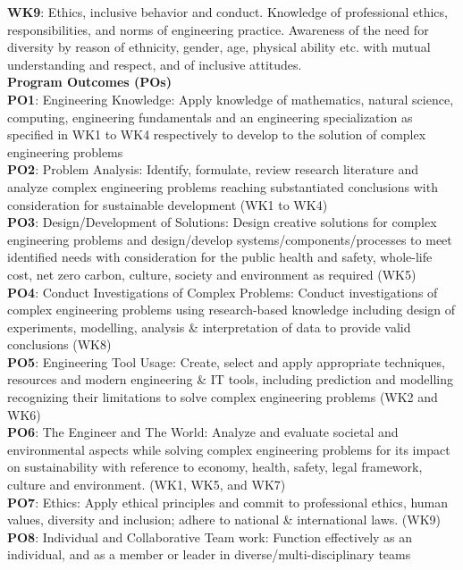 \begin{titlepage}
{\textbf{WK9}: Ethics, inclusive behavior and conduct. Knowledge of professional ethics,
responsibilities, and norms of engineering practice. Awareness of the need for diversity by reason of ethnicity, gender, age, physical ability etc. with mutual understanding and respect, and of inclusive attitudes.\\
\textbf{Program Outcomes (POs)}\\
\textbf{PO1}: Engineering Knowledge: Apply knowledge of mathematics, natural science, computing, engineering fundamentals and an engineering specialization as specified in WK1 to WK4 respectively to develop to the solution of complex engineering problems\\
\textbf{PO2}: Problem Analysis: Identify, formulate, review research literature and analyze complex engineering problems reaching substantiated conclusions with consideration for sustainable development (WK1 to WK4)\\
\textbf{PO3}: Design/Development of Solutions: Design creative solutions for complex engineering problems and design/develop systems/components/processes to meet identified needs with consideration for the public health and safety, whole-life cost, net zero carbon, culture, society and environment as required (WK5)\\
\textbf{PO4}: Conduct Investigations of Complex Problems: Conduct investigations of complex engineering problems using research-based knowledge including design of experiments, modelling, analysis \& interpretation of data to provide valid conclusions (WK8)\\
\textbf{PO5}: Engineering Tool Usage: Create, select and apply appropriate techniques, resources and modern engineering \& IT tools, including prediction and modelling recognizing their limitations to solve complex engineering problems (WK2 and WK6)\\
\textbf{PO6}: The Engineer and The World: Analyze and evaluate societal and environmental aspects while solving complex engineering problems for its impact on sustainability with reference to economy, health, safety, legal framework, culture and environment. (WK1, WK5, and WK7)\\
\textbf{PO7}: Ethics: Apply ethical principles and commit to professional ethics, human values, diversity and inclusion; adhere to national \& international laws. (WK9)\\
\textbf{PO8}: Individual and Collaborative Team work: Function effectively as an individual, and as a member or leader in diverse/multi-disciplinary teams\\
}
\end{titlepage}
